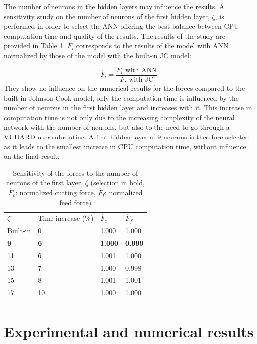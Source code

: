 \documentclass[preprint,12pt,times]{elsarticle}
\newcommand{\snsp}[2]{{#1}_{\!#2}}    %
\begin{document}
The number of neurons in the hidden layers may influence the results. A sensitivity study on the number of neurons of the first hidden layer, $\zeta$, is performed in order to select the ANN offering the best balance between CPU computation time and quality of the results. The results of the study are provided in Table \ref{tab:NbNeurons}. $\check{F_i}$ corresponds to the results of the model with ANN normalized by those of the model with the built-in JC model:

\begin{equation}
\check{F_i} = \frac{F_i\text{ with ANN}}{F_i\text{ with JC}}
\end{equation}
%
They show no influence on the numerical results for the forces compared to the built-in Johnson-Cook model, only the computation time is influenced by the number of neurons in the first hidden layer and increases with it. This increase in computation time is not only due to the increasing complexity of the neural network with the number of neurons, but also to the need to go through a VUHARD user subroutine. A first hidden layer of 9 neurons is therefore selected as it leads to the smallest increase in CPU computation time, without influence on the final result.

%
\begin{table}[!h]
\begin{center}
\caption{\label{tab:NbNeurons} Sensitivity of the forces to the number of neurons of the first layer, $\zeta$
(selection in bold, $\check{\snsp{F}{c}}$: normalized cutting force, $\check{\snsp{F}{f}}$: normalized feed force)}
\begin{tabular}{llll}
\hline\noalign{\smallskip}
$\zeta$  & Time increase (\unit{\%}) & $\check{\snsp{F}{c}}$ & $\check{\snsp{F}{f}}$\\
\noalign{\smallskip}\hline\noalign{\smallskip}
Built-in & 0 & 1.000 & 1.000\\
\textbf{9} & \textbf{6} & \textbf{1.000} & \textbf{0.999}\\
11 & 6 & 1.001 & 1.000\\
13 & 7 & 1.000 & 0.998\\
15 & 8 & 1.001 & 1.001\\
17 & 10 & 1.000 & 1.000\\
\noalign{\smallskip}\hline
\end{tabular}
\end{center}
\end{table}
%

\section{Experimental and numerical results\label{sec:ExpNumResults}}
\label{Results}
\end{document}
